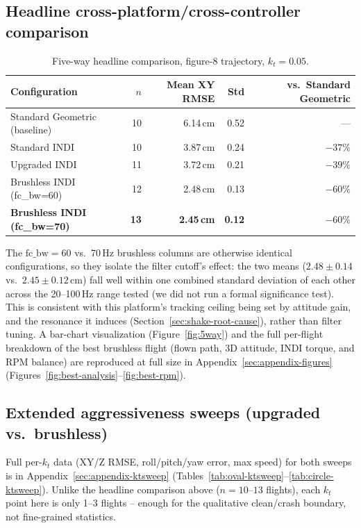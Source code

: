 \documentclass[11pt,a4paper]{article}
\begin{document}
\subsection{Headline cross-platform/cross-controller comparison}

\begin{table}[t]
\centering
\begin{tabular}{@{}lrrrr@{}}
\toprule
Configuration & $n$ & Mean XY RMSE & Std & vs.\ Standard Geometric \\
\midrule
Standard Geometric (baseline) & 10 & 6.14\,cm & 0.52 & --- \\
Standard INDI & 10 & 3.87\,cm & 0.24 & $-37\%$ \\
Upgraded INDI & 11 & 3.72\,cm & 0.21 & $-39\%$ \\
Brushless INDI (fc\_bw=60) & 12 & 2.48\,cm & 0.13 & $-60\%$ \\
\textbf{Brushless INDI (fc\_bw=70)} & \textbf{13} & \textbf{2.45\,cm} & \textbf{0.12} & \textbf{$-60\%$} \\
\bottomrule
\end{tabular}
\caption{Five-way headline comparison, figure-8 trajectory, $k_t=0.05$.}
\label{tab:headline}
\end{table}

The $\mathrm{fc\_bw}=60$ vs.\ 70\,Hz brushless columns are otherwise identical configurations, so
they isolate the filter cutoff's effect: the two means ($2.48\pm0.14$ vs.\ $2.45\pm0.12$\,cm) fall
well within one combined standard deviation of each other across the 20--100\,Hz range tested (we
did not run a formal significance test). This is consistent with this platform's tracking ceiling
being set by attitude gain, and the resonance it induces (Section~\ref{sec:shake-root-cause}),
rather than filter tuning. A bar-chart visualization (Figure~\ref{fig:5way}) and the full
per-flight breakdown of the best brushless flight (flown path, 3D attitude, INDI torque, and RPM
balance) are reproduced at full size in Appendix~\ref{sec:appendix-figures}
(Figures~\ref{fig:best-analysis}--\ref{fig:best-rpm}).

\subsection{Extended aggressiveness sweeps (upgraded vs.\ brushless)}
\label{sec:extended-sweeps}

Full per-$k_t$ data (XY/Z RMSE, roll/pitch/yaw error, max speed) for both sweeps is in
Appendix~\ref{sec:appendix-ktsweep} (Tables~\ref{tab:oval-ktsweep}--\ref{tab:circle-ktsweep}).
Unlike the headline comparison above ($n=10$--$13$ flights), each $k_t$ point here is only 1--3
flights -- enough for the qualitative clean/crash boundary, not fine-grained statistics.
\end{document}

